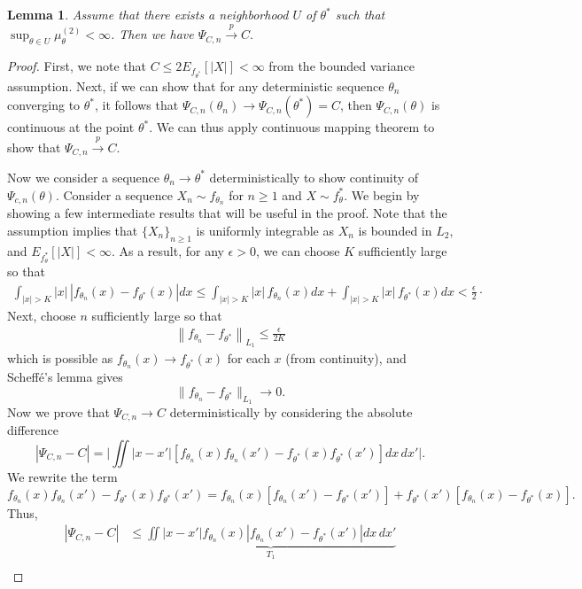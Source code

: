 \documentclass[11pt,a4paper]{article}
\theoremstyle{plain}
\newtheorem{lemma}{Lemma}
\theoremstyle{remark}
\theoremstyle{remark}
\begin{document}
\begin{lemma}
Assume that there exists a neighborhood $U$ of $\theta^*$ such that $\sup_{\theta \in U}\mu_\theta^{(2)} < \infty$. Then we have
$\Psi_{C,n}\overset{p}{\to} C.$ \label{lem:psi3}
\end{lemma}
\begin{proof}
First, we note that $C \leq 2E_{f_{\theta^*}}[|X|]<\infty$ from the bounded variance assumption. Next, if we can show that for any deterministic sequence $\theta_n$ converging to $\theta^*$, it follows that $\Psi_{C,n}(\theta_n)\to\Psi_{C,n}(\theta^*)=C$, then $\Psi_{C,n}(\theta)$ is continuous at the point $\theta^*$. We can thus apply continuous mapping theorem to show that $\Psi_{C,n}\overset{p}\to C$. 

Now we consider a sequence $\theta_n\to\theta^*$ deterministically to show continuity of $\Psi_{c,n}(\theta)$. Consider a sequence $X_n \sim f_{\theta_n}$ for $n \geq 1$ and $X \sim f_{\theta}^*$. 
We begin by showing a few intermediate results that will be useful in the proof. Note that the assumption implies that $\{X_n\}_{n \geq 1}$ is uniformly integrable as $X_n$ is bounded in $L_2$, and $E_{f_{\theta}^*}[|X|]<\infty$. As a result, for any $\epsilon > 0$, we can choose $K$ sufficiently large so that
\begin{align}
    \int_{|x|> K}|x|\,|f_{\theta_n}(x)-f_{\theta^*}(x)|dx\leq \int_{|x|> K}|x|\,f_{\theta_n}(x)dx+\int_{|x|> K}|x|\,f_{\theta^*}(x)dx <\frac{\epsilon}{2}\cdot \label{eq:ui1}
\end{align}
Next, choose $n$ sufficiently large so that
\begin{align}
    \left\|f_{\theta_n}-f_{\theta^*}\right\|_{L_1} \leq \frac{\epsilon}{2K} \label{eq:L1}
\end{align}
which is possible as $f_{\theta_n}(x) \to f_{\theta^*}(x)$ for each $x$ (from continuity), and Scheff\'{e}'s lemma gives
$$
\|f_{\theta_n}- f_{\theta^*}\|_{L_1} \to 0.
$$
Now we prove that $\Psi_{C,n}\to C$ deterministically by considering the absolute difference 
$$|\Psi_{C,n} -C|=\Big|\iint|x-x'|\left[f_{\theta_n}(x)f_{\theta_n}(x')-f_{\theta^*}(x)f_{\theta^*}(x')\right]dx\,dx'\Big|.$$
We rewrite the term 
$$f_{\theta_n}(x)f_{\theta_n}(x')-f_{\theta^*}(x)f_{\theta^*}(x')=f_{\theta_n}(x)\left[f_{\theta_n}(x')-f_{\theta^*}(x')\right]+f_{\theta^*}(x')\left[f_{\theta_n}(x)-f_{\theta^*}(x)\right].$$
Thus, 
\begin{align*}
|\Psi_{C,n}-C|&\leq \underbrace{\iint|x-x'|f_{\theta_n}(x)\left|f_{\theta_n}(x')-f_{\theta^*}(x')\right|dx\,dx'}_{T_1} \\

\end{align*}
\end{proof}
\end{document}
